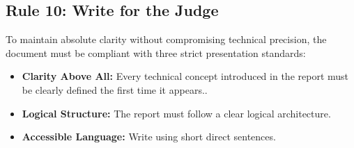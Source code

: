 \subsection{Rule 10: Write for the Judge}
To maintain absolute clarity without compromising technical precision, the document must be compliant with three strict presentation standards:
\begin{itemize}
    \item \textbf{Clarity Above All:} Every technical concept introduced in the report must be clearly defined the first time it appears..
    \item \textbf{Logical Structure:} The report must follow a clear logical architecture.
    \item \textbf{Accessible Language:} Write using short direct sentences.
\end{itemize}
